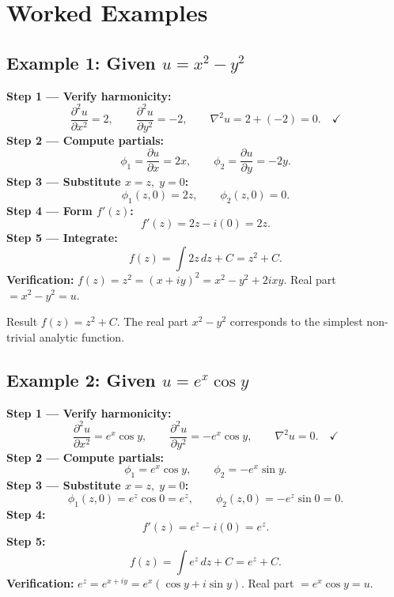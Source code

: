 \documentclass[12pt,a4paper]{article}
\begin{document}
\section{Worked Examples}

\subsection*{Example 1: Given \( u = x^2 - y^2 \)}

\textbf{Step 1 --- Verify harmonicity:}
\[
\frac{\partial^2 u}{\partial x^2} = 2, \qquad \frac{\partial^2 u}{\partial y^2} = -2, \qquad \nabla^2 u = 2 + (-2) = 0. \quad \checkmark
\]
\textbf{Step 2 --- Compute partials:}
\[
\phi_1 = \frac{\partial u}{\partial x} = 2x, \qquad \phi_2 = \frac{\partial u}{\partial y} = -2y.
\]
\textbf{Step 3 --- Substitute \( x=z,\; y=0 \):}
\[
\phi_1(z,0) = 2z, \qquad \phi_2(z,0) = 0.
\]
\textbf{Step 4 --- Form \( f'(z) \):}
\[
f'(z) = 2z - i(0) = 2z.
\]
\textbf{Step 5 --- Integrate:}
\[
f(z) = \int 2z\,dz + C = z^2 + C.
\]
\textbf{Verification:} \( f(z) = z^2 = (x+iy)^2 = x^2 - y^2 + 2ixy \). Real part \( = x^2 - y^2 = u \). \checkmark

\begin{learnbox}{Result}
\( f(z) = z^2 + C \). The real part \( x^2 - y^2 \) corresponds to the simplest non-trivial analytic function.
\end{learnbox}

\subsection*{Example 2: Given \( u = e^x \cos y \)}

\textbf{Step 1 --- Verify harmonicity:}
\[
\frac{\partial^2 u}{\partial x^2} = e^x \cos y, \qquad \frac{\partial^2 u}{\partial y^2} = -e^x \cos y, \qquad \nabla^2 u = 0. \quad \checkmark
\]
\textbf{Step 2 --- Compute partials:}
\[
\phi_1 = e^x \cos y, \qquad \phi_2 = -e^x \sin y.
\]
\textbf{Step 3 --- Substitute \( x=z,\; y=0 \):}
\[
\phi_1(z,0) = e^z \cos 0 = e^z, \qquad \phi_2(z,0) = -e^z \sin 0 = 0.
\]
\textbf{Step 4:}
\[
f'(z) = e^z - i(0) = e^z.
\]
\textbf{Step 5:}
\[
f(z) = \int e^z\,dz + C = e^z + C.
\]
\textbf{Verification:} \( e^z = e^{x+iy} = e^x(\cos y + i\sin y) \). Real part \( = e^x\cos y = u \). \checkmark
\end{document}
